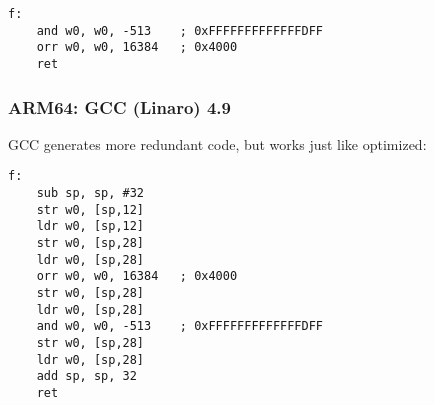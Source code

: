 \begin{lstlisting}[caption=\Optimizing GCC (Linaro) 4.9,style=customasmARM]
f:
	and	w0, w0, -513	; 0xFFFFFFFFFFFFFDFF
	orr	w0, w0, 16384	; 0x4000
	ret
\end{lstlisting}

\subsubsection{ARM64: \NonOptimizing GCC (Linaro) 4.9}

\NonOptimizing GCC generates more redundant code, but works just like optimized:

\begin{lstlisting}[caption=\NonOptimizing GCC (Linaro) 4.9,style=customasmARM]
f:
	sub	sp, sp, #32
	str	w0, [sp,12]
	ldr	w0, [sp,12]
	str	w0, [sp,28]
	ldr	w0, [sp,28]
	orr	w0, w0, 16384	; 0x4000
	str	w0, [sp,28]
	ldr	w0, [sp,28]
	and	w0, w0, -513	; 0xFFFFFFFFFFFFFDFF
	str	w0, [sp,28]
	ldr	w0, [sp,28]
	add	sp, sp, 32
	ret
\end{lstlisting}

